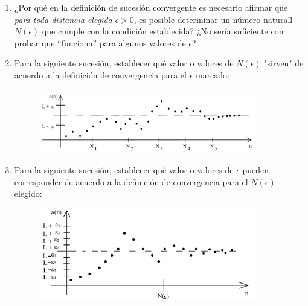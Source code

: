 \documentclass[12pt]{article}
\theoremstyle{definition}
\begin{document}
\begin{enumerate}
\item  ¿Por qué en la definición de sucesión convergente es necesario afirmar que \textit{para toda distancia elegida}  $\epsilon>0$, es posible determinar un número naturall $N(\epsilon)$ que cumple con la condición establecida? ¿No sería suficiente con probar que “funciona” para algunos valores de  $\epsilon$? 

\item Para la siguiente sucesión, establecer qué valor o valores de $N(\epsilon)$ "sirven" de acuerdo a la definición de convergencia para el $\epsilon$ marcado:
\begin{figure}[H]
\centering
\includegraphics[width=0.9\textwidth]{TP3Fig1}
\end{figure}

\item Para la siguiente sucesión, establecer qué valor o valores de $\epsilon$ pueden corresponder de acuerdo a la definición de convergencia para el  $N(\epsilon)$ elegido:
\begin{figure}[H]
\centering
\includegraphics[width=0.9\textwidth]{TP3Fig2}
\end{figure}


\end{enumerate}
\end{document}
